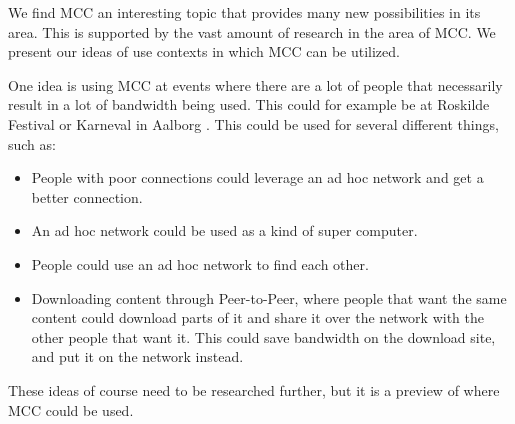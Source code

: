 We find MCC an interesting topic that provides many new possibilities in its area.
This is supported by the vast amount of research in the area of MCC.
We present our ideas of use contexts in which MCC can be utilized.

One idea is using MCC at events where there are a lot of people that necessarily result in a lot of bandwidth being used.
This could for example be at Roskilde Festival \citep{misc:roskilde} or Karneval in Aalborg \citep{misc:karneval}.
This could be used for several different things, such as:

\begin{itemize}
	\item People with poor connections could leverage an ad hoc network and get a better connection.
	\item An ad hoc network could be used as a kind of super computer.
	\item People could use an ad hoc network to find each other. 
	\item Downloading content through Peer-to-Peer, where people that want the same content could download parts of it and share it over the network with the other people that want it. This could save bandwidth on the download site, and put it on the network instead.
\end{itemize}

These ideas of course need to be researched further, but it is a preview of where MCC could be used. 